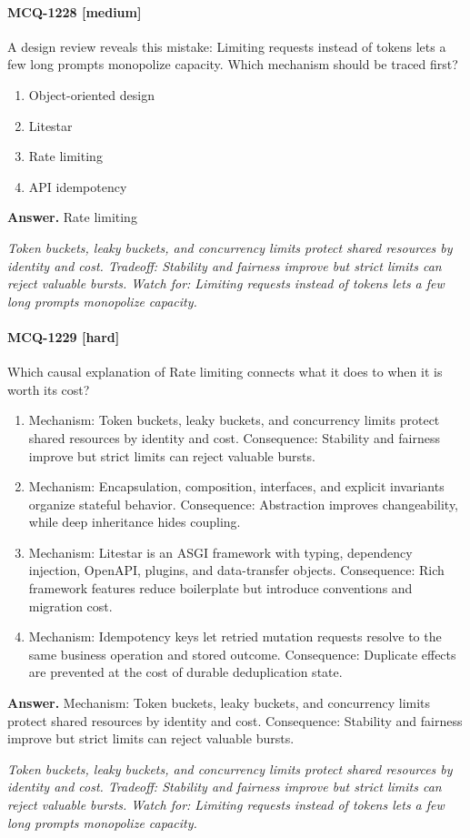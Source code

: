 \paragraph{MCQ-1228 [medium]} A design review reveals this mistake: Limiting requests instead of tokens lets a few long prompts monopolize capacity. Which mechanism should be traced first?
\begin{enumerate}[label=\Alph*.]
\item Object-oriented design
\item Litestar
\item Rate limiting
\item API idempotency
\end{enumerate}
\noindent\textbf{Answer.} Rate limiting
\par\textit{Token buckets, leaky buckets, and concurrency limits protect shared resources by identity and cost. Tradeoff: Stability and fairness improve but strict limits can reject valuable bursts. Watch for: Limiting requests instead of tokens lets a few long prompts monopolize capacity.}
\paragraph{MCQ-1229 [hard]} Which causal explanation of Rate limiting connects what it does to when it is worth its cost?
\begin{enumerate}[label=\Alph*.]
\item Mechanism: Token buckets, leaky buckets, and concurrency limits protect shared resources by identity and cost. Consequence: Stability and fairness improve but strict limits can reject valuable bursts.
\item Mechanism: Encapsulation, composition, interfaces, and explicit invariants organize stateful behavior. Consequence: Abstraction improves changeability, while deep inheritance hides coupling.
\item Mechanism: Litestar is an ASGI framework with typing, dependency injection, OpenAPI, plugins, and data-transfer objects. Consequence: Rich framework features reduce boilerplate but introduce conventions and migration cost.
\item Mechanism: Idempotency keys let retried mutation requests resolve to the same business operation and stored outcome. Consequence: Duplicate effects are prevented at the cost of durable deduplication state.
\end{enumerate}
\noindent\textbf{Answer.} Mechanism: Token buckets, leaky buckets, and concurrency limits protect shared resources by identity and cost. Consequence: Stability and fairness improve but strict limits can reject valuable bursts.
\par\textit{Token buckets, leaky buckets, and concurrency limits protect shared resources by identity and cost. Tradeoff: Stability and fairness improve but strict limits can reject valuable bursts. Watch for: Limiting requests instead of tokens lets a few long prompts monopolize capacity.}
